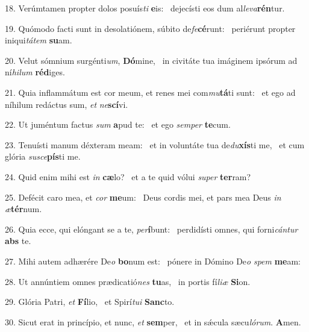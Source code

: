 18. Verúmtamen propter dolos posuís\textit{ti} \textbf{e}is: \ast\  dejecísti eos dum al\textit{le}\textit{va}\textbf{rén}tur.\

19. Quómodo facti sunt in desolatiónem, súbito de\textit{fe}\textbf{cé}runt: \ast\  periérunt propter iniqui\textit{tá}\textit{tem} \textbf{su}am.\

20. Velut sómnium surgénti\textit{um}, \textbf{Dó}mine, \ast\  in civitáte tua imáginem ipsórum ad ní\textit{hi}\textit{lum} \textbf{réd}iges.\

21. Quia inflammátum est cor meum, et renes mei com\textit{mu}\textbf{tá}ti sunt: \ast\  et ego ad níhilum redáctus sum, \textit{et} \textit{ne}\textbf{scí}vi.\

22. Ut juméntum factus \textit{sum} \textbf{a}pud te: \ast\  et ego \textit{sem}\textit{per} \textbf{te}cum.\

23. Tenuísti manum déxteram meam: \dag\  et in voluntáte tua de\textit{du}\textbf{xís}ti me, \ast\  et cum glória \textit{su}\textit{sce}\textbf{pís}ti me.\

24. Quid enim mihi est \textit{in} \textbf{cæ}lo? \ast\  et a te quid vólui \textit{su}\textit{per} \textbf{ter}ram?\

25. Defécit caro mea, et \textit{cor} \textbf{me}um: \ast\  Deus cordis mei, et pars mea Deus \textit{in} \textit{æ}\textbf{tér}num.\

26. Quia ecce, qui elóngant se a te, \textit{per}\textbf{í}bunt: \ast\  perdidísti omnes, qui forni\textit{cán}\textit{tur} \textbf{abs} te.\

27. Mihi autem adhærére De\textit{o} \textbf{bo}num est: \ast\  pónere in Dómino De\textit{o} \textit{spem} \textbf{me}am:\

28. Ut annúntiem omnes prædicatió\textit{nes} \textbf{tu}as, \ast\  in portis fí\textit{li}\textit{æ} \textbf{Si}on.\

29. Glória Patri, \textit{et} \textbf{Fí}lio, \ast\  et Spirí\textit{tu}\textit{i} \textbf{Sanc}to.\

30. Sicut erat in princípio, et nunc, \textit{et} \textbf{sem}per, \ast\  et in sǽcula sæcu\textit{ló}\textit{rum}. \textbf{A}men.\

